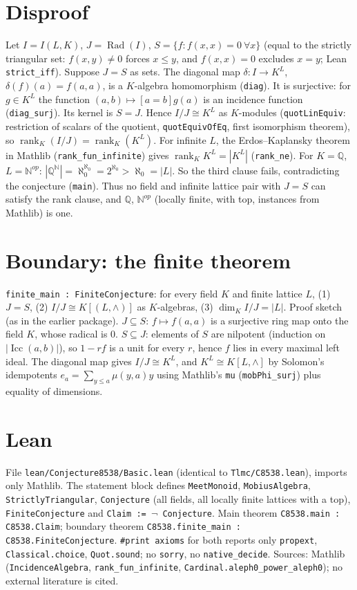 \documentclass[11pt]{article}
\newcommand{\Icc}{\operatorname{Icc}}
\begin{document}
\section*{Disproof}
Let $I=I(L,K)$, $J=\operatorname{Rad}(I)$, $S=\{f: f(x,x)=0\ \forall x\}$ (equal to the strictly triangular set: $f(x,y)\ne0$ forces $x\le y$, and
$f(x,x)=0$ excludes $x=y$; Lean \texttt{strict\_iff}). Suppose $J=S$ as sets.
The diagonal map $\delta:I\to K^L$, $\delta(f)(a)=f(a,a)$, is a $K$-algebra homomorphism (\texttt{diag}). It is surjective: for $g\in K^L$ the
function $(a,b)\mapsto[a=b]g(a)$ is an incidence function (\texttt{diag\_surj}). Its kernel is $S=J$. Hence $I/J\cong K^L$ as $K$-modules
(\texttt{quotLinEquiv}: restriction of scalars of the quotient, \texttt{quotEquivOfEq}, first isomorphism theorem), so
$\operatorname{rank}_K(I/J)=\operatorname{rank}_K(K^L)$. For infinite $L$, the Erdos--Kaplansky theorem in Mathlib (\texttt{rank\_fun\_infinite}) gives $\operatorname{rank}_K K^L=|K^L|$
(\texttt{rank\_ne}). For $K=\mathbb Q$, $L=\mathbb N^{op}$: $|\mathbb Q^{\mathbb N}|=\aleph_0^{\aleph_0}=2^{\aleph_0}>\aleph_0=|L|$. So the third clause
fails, contradicting the conjecture (\texttt{main}). Thus no field and infinite lattice pair with $J=S$ can satisfy the rank clause, and
$\mathbb Q$, $\mathbb N^{op}$ (locally finite, with top, instances from Mathlib) is one.

\section*{Boundary: the finite theorem}
\texttt{finite\_main : FiniteConjecture}: for every field $K$ and finite lattice $L$, (1) $J=S$, (2) $I/J\cong K[(L,\wedge)]$ as $K$-algebras, (3) $\dim_K I/J=|L|$.
Proof sketch (as in the earlier package). $J\subseteq S$: $f\mapsto f(a,a)$ is a surjective ring map onto the field $K$, whose radical is $0$.
$S\subseteq J$: elements of $S$ are nilpotent (induction on $|\Icc(a,b)|$), so $1-rf$ is a unit for every $r$, hence $f$ lies in every maximal left ideal.
The diagonal map gives $I/J\cong K^L$, and $K^L\cong K[L,\wedge]$ by Solomon's idempotents $e_a=\sum_{y\le a}\mu(y,a)y$ using Mathlib's
\texttt{mu} (\texttt{mobPhi\_surj}) plus equality of dimensions.

\section*{Lean}
File \texttt{lean/Conjecture8538/Basic.lean} (identical to \texttt{Tlmc/C8538.lean}), imports only Mathlib. The statement block defines \texttt{MeetMonoid},
\texttt{MobiusAlgebra}, \texttt{StrictlyTriangular}, \texttt{Conjecture} (all fields, all locally finite lattices with a top), \texttt{FiniteConjecture}
and \texttt{Claim := $\neg$ Conjecture}. Main theorem \texttt{C8538.main : C8538.Claim}; boundary theorem \texttt{C8538.finite\_main : C8538.FiniteConjecture}.
\texttt{\#print axioms} for both reports only \texttt{propext}, \texttt{Classical.choice}, \texttt{Quot.sound}; no \texttt{sorry}, no \texttt{native\_decide}.
Sources: Mathlib (\texttt{IncidenceAlgebra}, \texttt{rank\_fun\_infinite}, \texttt{Cardinal.aleph0\_power\_aleph0}); no external literature is cited.
\end{document}

